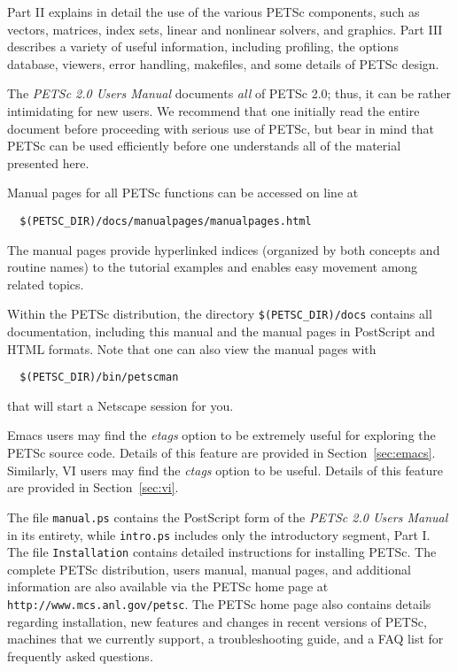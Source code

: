 Part II explains in detail the use of the various PETSc components,
such as vectors, matrices, index sets, linear and nonlinear
solvers, and graphics.  Part III describes a variety of useful
information, including profiling, the options database, viewers, error
handling, makefiles, and some details of
PETSc design.

\nocite{efficient}

The {\em PETSc 2.0 Users Manual} documents {\em all} of PETSc 2.0; thus,
it can be rather intimidating for new users. We recommend that one initially
read the entire document before proceeding with serious use of PETSc,
but bear in mind that PETSc can be used efficiently
before one understands all of the material presented here. 

\medskip \medskip

Manual pages for all PETSc functions can be
accessed on line at
\begin{verbatim}
  $(PETSC_DIR)/docs/manualpages/manualpages.html
\end{verbatim}
The manual pages
provide hyperlinked indices (organized by
both concepts and routine names) to the tutorial examples and enables
easy movement among related topics.  

Within the PETSc distribution, the directory
{\tt \$(PETSC\_DIR)/docs} contains all documentation, including this
manual and the manual pages in PostScript and HTML
formats. Note that one can also view the manual pages with
\begin{verbatim}
  $(PETSC_DIR)/bin/petscman
\end{verbatim}
that will start a Netscape session for you.

Emacs users may find the
{\em etags} option to be extremely useful for exploring the PETSc
source code.  Details of this feature are provided in
Section~\ref{sec:emacs}. Similarly, VI users may find the
{\em ctags} option to be useful. Details of this 
feature are provided in Section~\ref{sec:vi}.

The file {\tt manual.ps} contains the PostScript form of
the {\em PETSc 2.0 Users Manual} in its entirety, while {\tt intro.ps} 
includes only the introductory segment, Part I.   
The file {\tt Installation} contains detailed instructions for
installing PETSc. The complete PETSc distribution, users
manual, manual pages, and additional information are also available via
the PETSc home page at
{\tt http://www.mcs.anl.gov/petsc}.  The PETSc home page also
contains details regarding installation, new features and changes in recent
versions of PETSc, machines that we currently support, a
troubleshooting guide, and a FAQ list for frequently asked questions.

